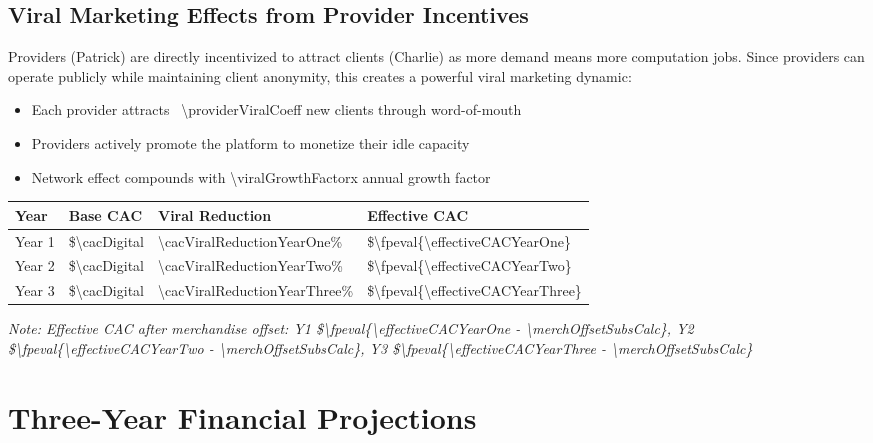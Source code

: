 \documentclass[11pt]{article}
\newcommand{\numfpeval}[1]{\num{\fpeval{#1}}}
\begin{document}
\subsection{Viral Marketing Effects from Provider Incentives}
Providers (Patrick) are directly incentivized to attract clients (Charlie) as more demand means more computation jobs. Since providers can operate publicly while maintaining client anonymity, this creates a powerful viral marketing dynamic\cite{hbs2016,parker2016}:
\begin{itemize}
  \item Each provider attracts ~\num{\providerViralCoeff} new clients through word-of-mouth\cite{kumar2018}
  \item Providers actively promote the platform to monetize their idle capacity
  \item Network effect compounds with \num{\viralGrowthFactor}x annual growth factor\cite{nfx2018}
\end{itemize}

\begin{table}[H]
\centering
\begin{tabularx}{\linewidth}{l Y Y Y}
\toprule
Year & Base CAC & Viral Reduction\cite{cbinsights2021} & Effective CAC \\\midrule
Year 1 & \$\num{\cacDigital} & \num{\cacViralReductionYearOne}\% & \$\numfpeval{\effectiveCACYearOne} \\
Year 2 & \$\num{\cacDigital} & \num{\cacViralReductionYearTwo}\% & \$\numfpeval{\effectiveCACYearTwo} \\
Year 3 & \$\num{\cacDigital} & \num{\cacViralReductionYearThree}\% & \$\numfpeval{\effectiveCACYearThree} \\
\bottomrule
\end{tabularx}
\end{table}
\textit{Note: Effective CAC after merchandise offset: Y1 \$\numfpeval{\effectiveCACYearOne - \merchOffsetSubsCalc}, Y2 \$\numfpeval{\effectiveCACYearTwo - \merchOffsetSubsCalc}, Y3 \$\numfpeval{\effectiveCACYearThree - \merchOffsetSubsCalc}}

\section{Three-Year Financial Projections}
\end{document}
